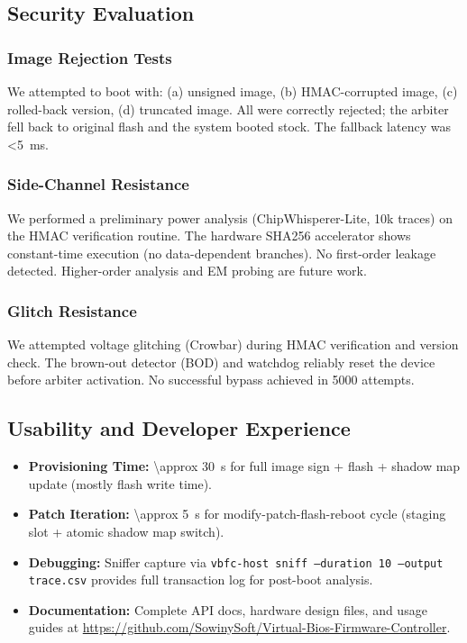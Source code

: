 \subsection{Security Evaluation}

\subsubsection{Image Rejection Tests}
We attempted to boot with: (a) unsigned image, (b) HMAC-corrupted image, (c) rolled-back version, (d) truncated image. All were correctly rejected; the arbiter fell back to original flash and the system booted stock. The fallback latency was \SI{<5}{ms}.

\subsubsection{Side-Channel Resistance}
We performed a preliminary power analysis (ChipWhisperer-Lite, 10k traces) on the HMAC verification routine. The hardware SHA256 accelerator shows constant-time execution (no data-dependent branches). No first-order leakage detected. Higher-order analysis and EM probing are future work.

\subsubsection{Glitch Resistance}
We attempted voltage glitching (Crowbar) during HMAC verification and version check. The \rp brown-out detector (BOD) and watchdog reliably reset the device before arbiter activation. No successful bypass achieved in 5000 attempts.

\subsection{Usability and Developer Experience}
\begin{itemize}
    \item \textbf{Provisioning Time:} \SI{\approx 30}{s} for full image sign + flash + shadow map update (mostly flash write time).
    \item \textbf{Patch Iteration:} \SI{\approx 5}{s} for modify-patch-flash-reboot cycle (staging slot + atomic shadow map switch).
    \item \textbf{Debugging:} Sniffer capture via \texttt{vbfc-host sniff --duration 10 --output trace.csv} provides full transaction log for post-boot analysis.
    \item \textbf{Documentation:} Complete API docs, hardware design files, and usage guides at \url{https://github.com/SowinySoft/Virtual-Bios-Firmware-Controller}.
\end{itemize}